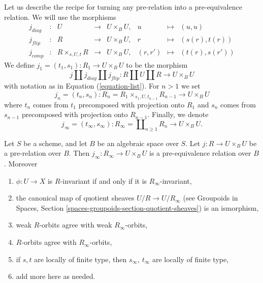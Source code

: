 \noindent
Let us describe the recipe for turning any pre-relation into a
pre-equivalence relation. We will use the morphisms
\begin{equation}
\label{equation-list}
\begin{matrix}
j_{diag} &
: &
U &
\longrightarrow &
U \times_B U, &
u &
\longmapsto &
(u, u) \\
j_{flip} &
: &
R &
\longrightarrow &
U \times_B U, &
r &
\longmapsto &
(s(r), t(r)) \\
j_{comp} &
: &
R \times_{s, U, t} R &
\longrightarrow &
U \times_B U, &
(r, r') &
\longmapsto &
(t(r), s(r'))
\end{matrix}
\end{equation}
We define $j_1 = (t_1, s_1) : R_1 \to U \times_B U$ to be the morphism
$$
j \amalg j_{diag} \amalg j_{flip} :
R \amalg U \amalg R
\longrightarrow
U \times_B U
$$
with notation as in
Equation (\ref{equation-list}).
For $n > 1$ we set
$$
j_n = (t_n, s_n) :
R_n = R_1 \times_{s_1, U, t_{n - 1}} R_{n - 1} \longrightarrow U \times_B U
$$
where $t_n$ comes from $t_1$ precomposed with projection onto $R_1$ and
$s_n$ comes from $s_{n - 1}$ precomposed with projection onto $R_{n - 1}$.
Finally, we denote
$$
j_\infty = (t_\infty, s_\infty) :
R_\infty = \coprod\nolimits_{n \geq 1} R_n 
\longrightarrow
U \times_B U.
$$

\begin{lemma}
\label{lemma-make-pre-equivalence}
Let $S$ be a scheme, and let $B$ be an algebraic space over $S$.
Let $j : R \to U \times_B U$ be a pre-relation over $B$.
Then $j_\infty : R_\infty \to U \times_B U$ is a
pre-equivalence relation over $B$. Moreover
\begin{enumerate}
\item $\phi : U \to X$ is $R$-invariant if and only if it is
$R_\infty$-invariant,
\item the canonical map of quotient sheaves $U/R \to U/R_\infty$ (see
Groupoids in Spaces, Section \ref{spaces-groupoids-section-quotient-sheaves})
is an ismorphism,
\item weak $R$-orbits agree with weak $R_\infty$-orbits,
\item $R$-orbits agree with $R_\infty$-orbits,
\item if $s, t$ are locally of finite type, then $s_\infty$, $t_\infty$
are locally of finite type,
\item add more here as needed.
\end{enumerate}
\end{lemma}

